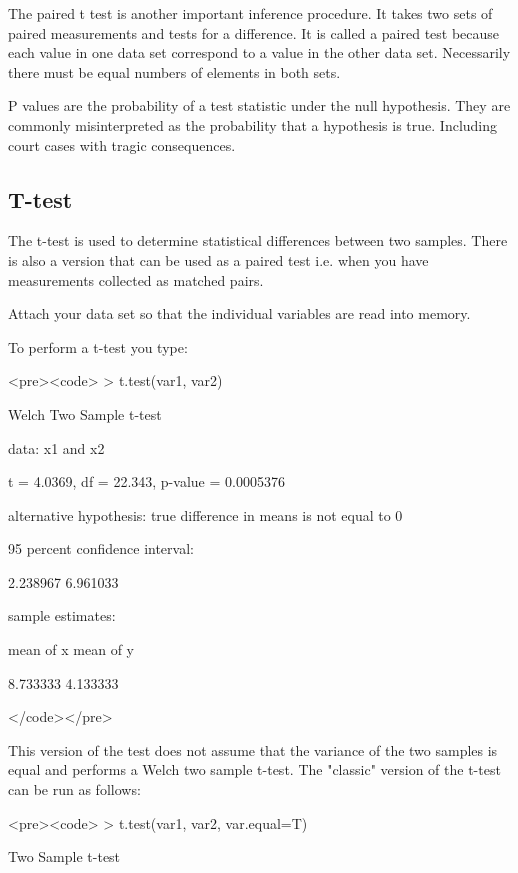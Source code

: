 \begin{framed}
\begin{framed}
\begin{framed}
The paired t test is another important inference procedure. It takes two sets of paired measurements and tests for a difference. It is called a paired test because each value in one data set  correspond to a value in the other data set. Necessarily there must be equal numbers of elements in both sets.


P values are the probability of a test statistic under the null hypothesis. They are commonly misinterpreted as the probability that a hypothesis is true. Including court cases with tragic consequences.




\subsection{T-test}

The t-test is used to determine statistical differences between two samples. There is also a version that can be used as a paired test i.e. when you have measurements collected as matched pairs.


Attach your data set so that the individual variables are read into memory.

To perform a t-test you type:

\begin{framed}
<pre><code>
> t.test(var1, var2)

Welch Two Sample t-test

data: x1 and x2

t = 4.0369, df = 22.343, p-value = 0.0005376

alternative hypothesis: true difference in means is not equal to 0

95 percent confidence interval:

2.238967 6.961033

sample estimates:

mean of x mean of y

8.733333 4.133333

</code></pre>


This version of the test does not assume that the variance of the two samples is equal and performs a Welch two sample t-test. The "classic" version of the t-test can be run as follows:

\begin{framed}
<pre><code>
> t.test(var1, var2, var.equal=T)

Two Sample t-test


\end{framed}
\end{framed}
\end{framed}
\end{framed}
\end{framed}
